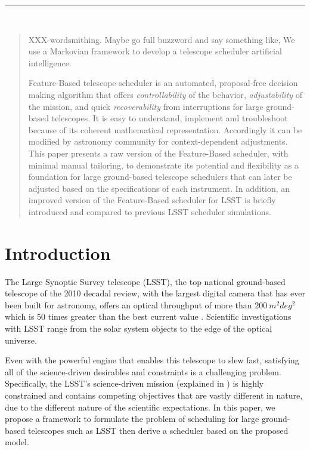 \documentclass[12pt]{aastex62}
\theoremstyle{definition}
\begin{document}
\noindent\rule{\textwidth}{0.4pt}\\
\newpage

\begin{abstract}

XXX-wordsmithing. Maybe go full buzzword and say something like, We use a Markovian framework to develop a telescope scheduler artificial intelligence. 

Feature-Based telescope scheduler is an automated, proposal-free decision making algorithm that offers \textit{controllability} of the behavior, \textit{adjustability} of the mission, and quick \textit{recoverability} from interruptions for large ground-based telescopes. It is easy to understand, implement and troubleshoot because of its coherent mathematical representation. Accordingly it can be modified by astronomy community for context-dependent adjustments. This paper presents a raw version of the Feature-Based scheduler, with minimal manual tailoring, to demonstrate its potential and flexibility as a foundation for large ground-based telescope schedulers that can later be adjusted based on the specifications of each instrument. In addition, an improved version of the Feature-Based scheduler for LSST is briefly introduced and compared to previous LSST scheduler simulations.
\end{abstract}

\section{Introduction}

The Large Synoptic Survey telescope (LSST), the top national ground-based telescope of the 2010 decadal review, with the largest digital camera that has ever been built for astronomy, offers an optical throughput of more than $200~m^2 deg^2$ which is 50 times greater than the best current value \citep{tyson2002large}. Scientific investigations with LSST range from the solar system objects to the edge of the optical universe. 

Even with the powerful engine that enables this telescope to slew fast, satisfying all of the science-driven desirables and constraints is a challenging problem. Specifically, the LSST's science-driven mission (explained in \citep{ivezic2008large}) is highly constrained and contains competing objectives that are vastly different in nature, due to the different nature of the scientific expectations. In this paper, we propose a framework to formulate the problem of scheduling for large ground-based telescopes such as LSST then derive a scheduler based on the proposed model.
\end{document}

